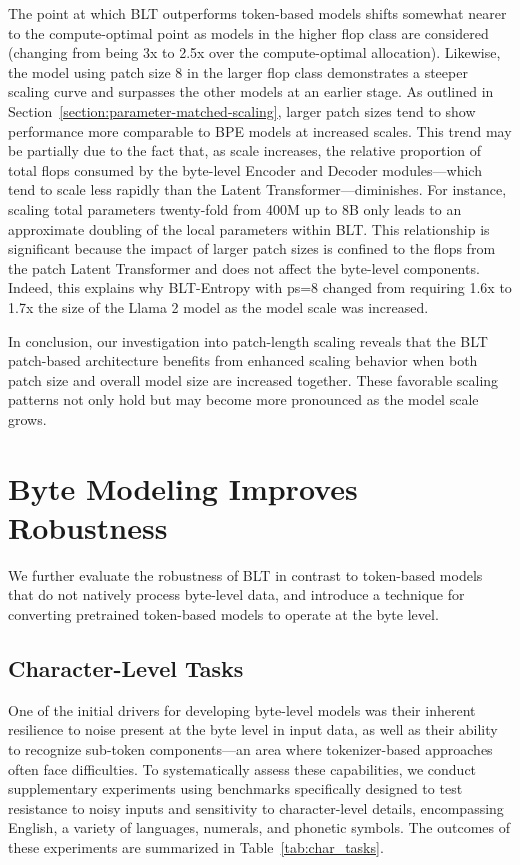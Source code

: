 The point at which {\textsc BLT} outperforms token-based models shifts somewhat nearer to the compute-optimal point as models in the higher flop class are considered (changing from being 3x to 2.5x over the compute-optimal allocation). Likewise, the model using patch size 8 in the larger flop class demonstrates a steeper scaling curve and surpasses the other models at an earlier stage. As outlined in Section~\ref{section:parameter-matched-scaling}, larger patch sizes tend to show performance more comparable to BPE models at increased scales. This trend may be partially due to the fact that, as scale increases, the relative proportion of total flops consumed by the byte-level Encoder and Decoder modules—which tend to scale less rapidly than the Latent Transformer—diminishes. For instance, scaling total parameters twenty-fold from 400M up to 8B only leads to an approximate doubling of the local parameters within {\textsc BLT}. This relationship is significant because the impact of larger patch sizes is confined to the flops from the patch Latent Transformer and does not affect the byte-level components. Indeed, this explains why {\textsc BLT}-Entropy with ps=8 changed from requiring 1.6x to 1.7x the size of the Llama 2 model as the model scale was increased.

In conclusion, our investigation into patch-length scaling reveals that the {\textsc BLT} patch-based architecture benefits from enhanced scaling behavior when both patch size and overall model size are increased together. These favorable scaling patterns not only hold but may become more pronounced as the model scale grows.

\section{Byte Modeling Improves Robustness} We further evaluate the robustness of {\textsc BLT} in contrast to token-based models that do not natively process byte-level data, and introduce a technique for converting pretrained token-based models to operate at the byte level.
\label{sec:robustness}

\subsection{Character-Level Tasks}

One of the initial drivers for developing byte-level models was their inherent resilience to noise present at the byte level in input data, as well as their ability to recognize sub-token components—an area where tokenizer-based approaches often face difficulties. To systematically assess these capabilities, we conduct supplementary experiments using benchmarks specifically designed to test resistance to noisy inputs and sensitivity to character-level details, encompassing English, a variety of languages, numerals, and phonetic symbols. The outcomes of these experiments are summarized in Table~\ref{tab:char_tasks}.

